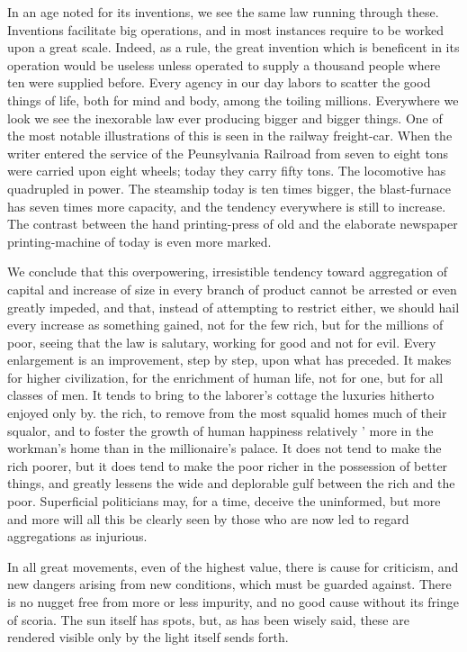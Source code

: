 \documentclass[11pt,openany]{book}
\begin{document}
In an age noted for its inventions, we see the same law running through these. Inventions facilitate big operations, and in most instances require to be worked upon a great scale. Indeed, as a rule, the great invention which is beneficent in its operation would be useless unless operated to supply a thousand people where ten were supplied before. Every agency in our day labors to scatter the good things of life, both for mind and body, among the toiling millions. Everywhere we look we see the inexorable law ever producing bigger and bigger things. One of the most notable illustrations of this is seen in the railway freight-car. When the writer entered the service of the Peunsylvania Railroad from seven to eight tons were carried upon eight wheels; today they carry fifty tons. The locomotive has quadrupled in power. The steamship today is ten times bigger, the blast-furnace has seven times more capacity, and the tendency everywhere is still to increase. The contrast between the hand printing-press of old and the elaborate newspaper printing-machine of today is even more marked.

We conclude that this overpowering, irresistible tendency toward aggregation of capital and increase of size in every branch of product cannot be arrested or even greatly impeded, and that, instead of attempting to restrict either, we should hail every increase as something gained, not for the few rich, but for the millions of poor, seeing that the law is salutary, working for good and not for evil. Every enlargement is an improvement, step by step, upon what has preceded. It makes for higher civilization, for the enrichment of human life, not for one, but for all classes of men. It tends to bring to the laborer's cottage the luxuries hitherto enjoyed only by. the rich, to remove from the most squalid homes much of their squalor, and to foster the growth of human happiness relatively ' more in the workman's home than in the millionaire's palace. It does not tend to make the rich poorer, but it does tend to make the poor richer in the possession of better things, and greatly lessens the wide and deplorable gulf between the rich and the poor. Superficial politicians may, for a time, deceive the uninformed, but more and more will all this be clearly seen by those who are now led to regard aggregations as injurious.

In all great movements, even of the highest value, there is cause for criticism, and new dangers arising from new conditions, which must be guarded against. There is no nugget free from more or less impurity, and no good cause without its fringe of scoria. The sun itself has spots, but, as has been wisely said, these are rendered visible only by the light itself sends forth.
\end{document}

